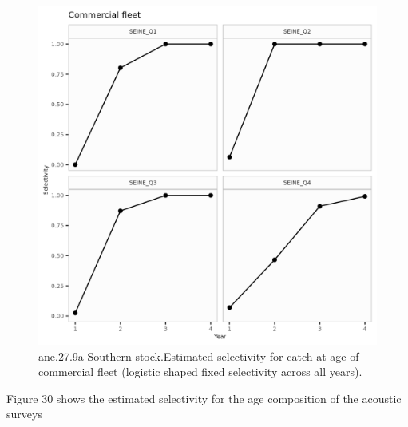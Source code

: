 \documentclass[
]{article}
\begin{document}
\begin{figure}[H]

{\centering \includegraphics[width=0.95\linewidth]{report/run/S1.0_4FLEETS_SelECO_RecIndex_Mnewfix/fig_Sel_commercial_fleet} 

}

\caption{ane.27.9a Southern stock.Estimated selectivity for catch-at-age of commercial fleet (logistic shaped fixed selectivity across all years).}\label{fig:unnamed-chunk-61}
\end{figure}

Figure 30 shows the estimated selectivity for the age composition of the
acoustic surveys
\end{document}
